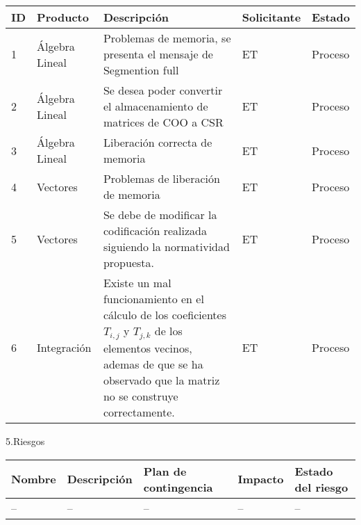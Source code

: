 \documentclass[12pt]{report}
\numberwithin{equation}{section}
\begin{document}
\begin{flushleft}
\begin{table}[H]
\begin{tabular}{|m{0.5cm}|m{2cm}|m{4.5cm}|m{3.5cm}|m{3.5cm}|}
\hline 
\textbf{ID} & \textbf{Producto} & \textbf{Descripci\'on} & \textbf{Solicitante} & \textbf{Estado}  \\
\hline
\hline
1 & \small{\'Algebra Lineal}  & \small{Problemas de memoria, se presenta el mensaje de Segmention full} &\small{ET} & \small{Proceso}\\
\hline
2 & \small{\'Algebra Lineal}  & \small{Se desea poder convertir el almacenamiento de matrices de COO a CSR} &\small{ET} & \small{Proceso}\\
\hline
3 & \small{\'Algebra Lineal}  & \small{Liberaci\'on correcta de memoria} &\small{ET} & \small{Proceso}\\
\hline
4 & \small{Vectores}  & \small{Problemas de liberaci\'on de memoria} &\small{ET} & \small{Proceso}\\
\hline
5 & \small{Vectores}  & \small{Se debe de modificar la codificaci\'on realizada siguiendo la normatividad propuesta.} &\small{ET} & \small{Proceso}\\
\hline
6 & \small{Integraci\'on}  & \small{Existe un mal funcionamiento en el c\'alculo de los coeficientes $T_{i,j}$ y $T_{j,k}$ de los elementos vecinos, ademas de que se ha observado que la matriz no se construye correctamente.} &\small{ET} & \small{Proceso}\\
\hline
\end{tabular}
\label{tabla: TABLA CE Cambios Seg}
\end{table}

\newpage

\large{5.Riesgos}\\


\begin{table}[H]
\begin{tabular}{|m{2cm}|m{4cm}|m{4cm}|m{2cm}|m{2cm}|}
\hline 
\textbf{Nombre } & \textbf{Descripci\'on} & \textbf{Plan de contingencia} & \textbf{Impacto} & \textbf{Estado del riesgo}  \\
\hline
\hline
\small{--} &\small{--} & \small{--} & --   & -- \\
\hline
\end{tabular}
\label{tabla: TABLA CE de nuevos riesgos Seg}
\end{table}


\end{flushleft}
\end{document}
